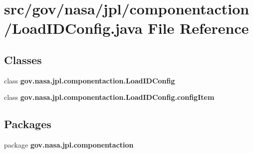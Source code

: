 \section{src/gov/nasa/jpl/componentaction/\+Load\+I\+D\+Config.java File Reference}
\label{_load_i_d_config_8java}
\subsection*{Classes}
\begin{DoxyCompactItemize}
\item 
class {\bf gov.\+nasa.\+jpl.\+componentaction.\+Load\+I\+D\+Config}
\item 
class {\bf gov.\+nasa.\+jpl.\+componentaction.\+Load\+I\+D\+Config.\+config\+Item}
\end{DoxyCompactItemize}
\subsection*{Packages}
\begin{DoxyCompactItemize}
\item 
package {\bf gov.\+nasa.\+jpl.\+componentaction}
\end{DoxyCompactItemize}

